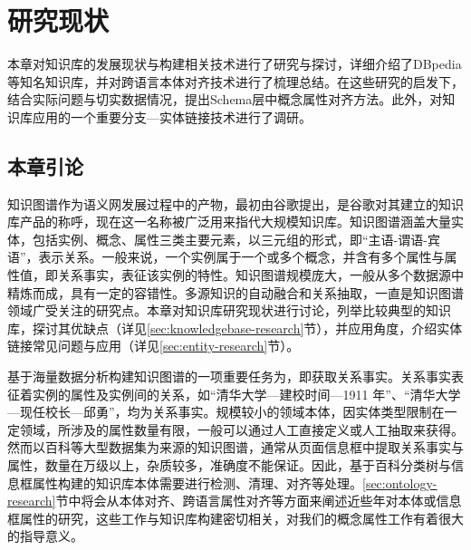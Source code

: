\chapter{研究现状}
\label{cha:research}
本章对知识库的发展现状与构建相关技术进行了研究与探讨，详细介绍了DBpedia等知名知识库，并对跨语言本体对齐技术进行了梳理总结。在这些研究的启发下，结合实际问题与切实数据情况，提出Schema层中概念属性对齐方法。此外，对知识库应用的一个重要分支—实体链接技术进行了调研。

\section{本章引论}

知识图谱作为语义网发展过程中的产物，最初由谷歌提出，是谷歌对其建立的知识库产品的称呼，现在这一名称被广泛用来指代大规模知识库。知识图谱涵盖大量实体，包括实例、概念、属性三类主要元素，以三元组的形式，即“主语-谓语-宾语”，表示关系。一般来说，一个实例属于一个或多个概念，并含有多个属性与属性值，即关系事实，表征该实例的特性。知识图谱规模庞大，一般从多个数据源中精炼而成，具有一定的容错性。多源知识的自动融合和关系抽取，一直是知识图谱领域广受关注的研究点。本章对知识库研究现状进行讨论，列举比较典型的知识库，探讨其优缺点（详见\ref{sec:knowledgebase-research}节），并应用角度，介绍实体链接常见问题与应用（详见\ref{sec:entity-research}节）。

基于海量数据分析构建知识图谱的一项重要任务为，即获取关系事实\cite{suchanek2014knowledge}。关系事实表征着实例的属性及实例间的关系，如“清华大学—建校时间—1911 年”、“清华大学—现任校长—邱勇”，均为关系事实。规模较小的领域本体，因实体类型限制在一定领域，所涉及的属性数量有限，一般可以通过人工直接定义\cite{boyce2007developing}或人工抽取\cite{wang:movie}来获得。然而以百科等大型数据集为来源的知识图谱，通常从页面信息框中提取关系事实与属性，数量在万级以上，杂质较多，准确度不能保证。因此，基于百科分类树与信息框属性构建的知识库本体需要进行检测、清理、对齐等处理。\ref{sec:ontology-research}节中将会从本体对齐、跨语言属性对齐等方面来阐述近些年对本体或信息框属性的研究，这些工作与知识库构建密切相关，对我们的概念属性工作有着很大的指导意义。

